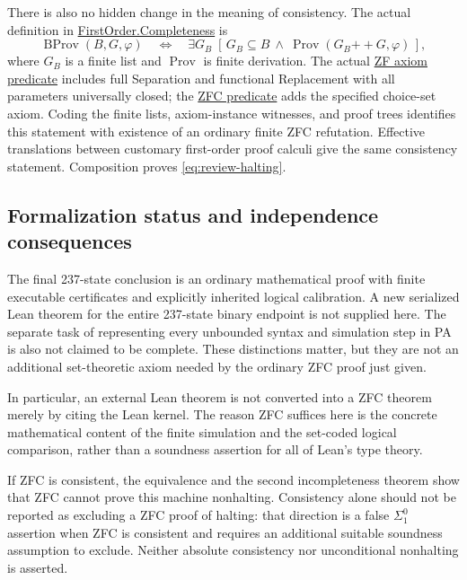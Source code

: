 There is also no hidden change in the meaning of consistency.
The actual definition in
\href{https://github.com/VladimirReshetnikov/ProveIt/blob/ce192939372ac7944fe2a0208c68a96d49fb5e3b/Logic/FirstOrder/Lean/FirstOrder/Completeness.lean}
{FirstOrder.Completeness} is
\[
 \operatorname{BProv}(B,G,\varphi)
 \quad\Longleftrightarrow\quad
 \exists G_B\;[\,G_B\subseteq B\ \land\
                   \operatorname{Prov}(G_B\mathbin{+\!+}G,\varphi)\,],
\]
where $G_B$ is a finite list and $\operatorname{Prov}$ is finite derivation.
The actual
\href{https://github.com/VladimirReshetnikov/ProveIt/blob/ce192939372ac7944fe2a0208c68a96d49fb5e3b/SetTheory/ZF/Lean/ZF/Zf.lean}
{ZF axiom predicate} includes full Separation and functional Replacement
with all parameters universally closed; the
\href{https://github.com/VladimirReshetnikov/ProveIt/blob/ce192939372ac7944fe2a0208c68a96d49fb5e3b/SetTheory/BoundedConsistency/Lean/BoundedZFCConsistency/Choice.lean}
{ZFC predicate} adds the specified choice-set axiom.  Coding the finite
lists, axiom-instance witnesses, and proof trees identifies this statement
with existence of an ordinary finite ZFC refutation.  Effective translations
between customary first-order proof calculi give the same consistency
statement.  Composition proves \eqref{eq:review-halting}.

\subsection{Formalization status and independence consequences}

The final 237-state conclusion is an ordinary mathematical proof with
finite executable certificates and explicitly inherited logical
calibration.  A new serialized Lean theorem for the entire 237-state
binary endpoint is not supplied here.  The separate task of representing
every unbounded syntax and simulation step in PA is also not claimed to
be complete.  These distinctions matter, but they are not an additional
set-theoretic axiom needed by the ordinary ZFC proof just given.

In particular, an external Lean theorem is not converted into a ZFC
theorem merely by citing the Lean kernel.  The reason ZFC suffices here
is the concrete mathematical content of the finite simulation and the
set-coded logical comparison, rather than a soundness assertion for all
of Lean's type theory.

If ZFC is consistent, the equivalence and the second incompleteness
theorem show that ZFC cannot prove this machine nonhalting.  Consistency
alone should not be reported as excluding a ZFC proof of halting: that
direction is a false $\Sigma^0_1$ assertion when ZFC is consistent and
requires an additional suitable soundness assumption to exclude.
Neither absolute consistency nor unconditional nonhalting is asserted.

